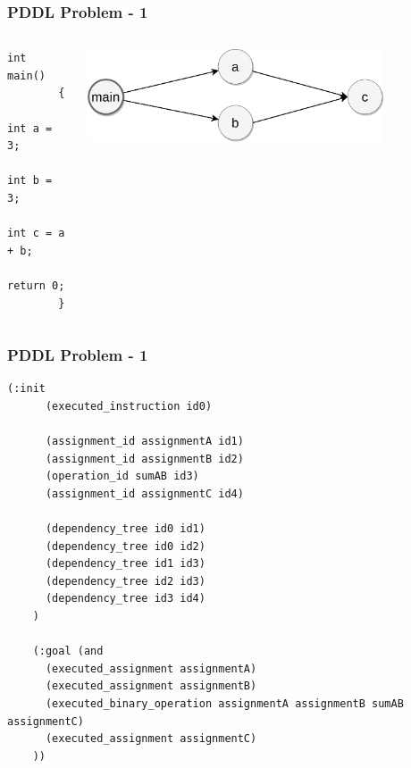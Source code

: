 \documentclass{beamer}
\begin{document}
\begin{frame}[fragile]
  \frametitle{PDDL Problem - 1}

  \begin{columns}
    \begin{column}{0.35\textwidth}
      \begin{lstlisting}[style=cppStyle]
        int main()
        {
          int a = 3;
          int b = 3;
          int c = a + b;
          return 0;
        }
      \end{lstlisting}
    \end{column}
    \begin{column}{0.65\textwidth}
      \begin{center}
        \includegraphics[width=0.8\textwidth]{../images/dependency-tree-Parallel.png}
      \end{center}
    \end{column}
  \end{columns}
\end{frame}

\begin{frame}[fragile]
  \frametitle{PDDL Problem - 1}

  \begin{lstlisting}[style=pddlStyle,basicstyle=\ttfamily\fontsize{10pt}{10pt}\selectfont]
    (:init
      (executed_instruction id0)

      (assignment_id assignmentA id1)
      (assignment_id assignmentB id2)
      (operation_id sumAB id3)
      (assignment_id assignmentC id4)
      
      (dependency_tree id0 id1)
      (dependency_tree id0 id2)
      (dependency_tree id1 id3)
      (dependency_tree id2 id3)
      (dependency_tree id3 id4)
    )

    (:goal (and
      (executed_assignment assignmentA)
      (executed_assignment assignmentB)
      (executed_binary_operation assignmentA assignmentB sumAB assignmentC)
      (executed_assignment assignmentC)
    ))
  \end{lstlisting}
\end{frame}
\end{document}
